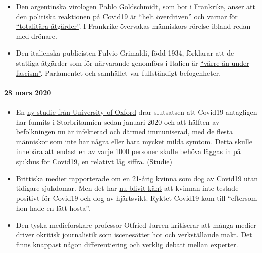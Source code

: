 \begin{itemize}
\item
  Den argentinska virologen Pablo Goldschmidt, som bor i Frankrike,
  anser att den politiska reaktionen på Covid19 är ``helt överdriven''
  och varnar för
  \href{https://www.infobae.com/coronavirus/2020/03/28/para-un-prestigioso-cientifico-argentino-el-coronavirus-no-merece-que-el-planeta-este-en-un-estado-de-parate-total/}{``totalitära
  åtgärder''}. I Frankrike övervakas människors rörelse ibland redan med
  drönare.
\item
  Den italienska publicisten Fulvio Grimaldi, född 1934, förklarar att
  de statliga åtgärder som för närvarande genomförs i Italien är
  \href{https://www.youtube.com/watch?v=O3BuNp01vpc}{``värre än under
  fascism''}. Parlamentet och samhället var fullständigt befogenheter.
\end{itemize}

\hypertarget{28-mars-2020}{%
\paragraph{28 mars 2020}\label{28-mars-2020}}

\begin{itemize}
\tightlist
\item
  En
  \href{https://news.yahoo.com/oxford-study-suggests-millions-people-221100162.html}{ny
  studie från University of Oxford} drar slutsatsen att Covid19
  antagligen har funnits i Storbritannien sedan januari 2020 och att
  hälften av befolkningen nu är infekterad och därmed immuniserad, med
  de flesta människor som inte har några eller bara mycket milda symtom.
  Detta skulle innebära att endast en av varje 1000 personer skulle
  behöva läggas in på sjukhus för Covid19, en relativt låg siffra.
  \href{https://www.medrxiv.org/content/10.1101/2020.03.24.20042291v1}{(Studie)}
\item
  Brittiska medier
  \href{https://www.bbc.com/news/uk-england-beds-bucks-herts-52041709}{rapporterade}
  om en 21-årig kvinna som dog av Covid19 utan tidigare sjukdomar. Men
  det har
  \href{https://archive.is/20200329015127/https://www.theguardian.com/world/2020/mar/27/chloe-middleton-death-21-year-old-not-recorded-nhs-covid-19-related}{nu
  blivit känt} att kvinnan inte testade positivt för Covid19 och dog av
  hjärtsvikt. Ryktet Covid19 kom till ``eftersom hon hade en lätt
  hosta''.
\item
  Den tyska medieforskare professor Otfried Jarren kritiserar att många
  medier driver
  \href{https://www.deutschlandfunk.de/covid-19-scharfe-kritik-an-ard-und-zdf-wegen.2849.de.html?drn:news_id=1114517}{okritisk
  journalistik} som iscenesätter hot och verkställande makt. Det finns
  knappast någon differentiering och verklig debatt mellan experter.
\end{itemize}

